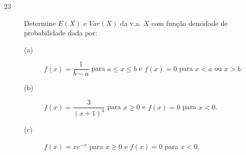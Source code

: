 \documentclass{report}
\begin{document}
\begin{description}

\item[{\large 23}] Determine $E(X)$ e $Var(X)$ da v.a. $X$ com função densidade de probabilidade dada por:


\begin{description}

\item[(a)] $f(x)=\dfrac{1}{b-a}$ para $a\leq x\leq b$ e $f(x)=0$ para $x<a$ ou $x>b$.
\item[(b)] $f(x)=\dfrac{3}{(x+1)^{4}}$ para $x\geq 0$ e $f(x)=0$ para $x<0$.
\item[(c)] $f(x)=xe^{-x}$ para $x\geq 0$ e $f(x)=0$ para $x<0$.
\end{description}

\end{description}
\end{document}
